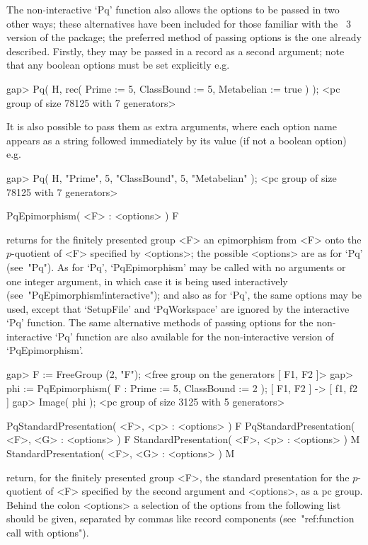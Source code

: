 The non-interactive `Pq' function also allows the options to be passed in
two other ways; these alternatives have been included for those  familiar
with the {\GAP}~3 version of the {\ANUPQ} package; the  preferred  method
of passing options is the one already described.  Firstly,  they  may  be
passed in a record as a second argument; note that  any  boolean  options
must be set explicitly e.g.

\beginexample
gap> Pq( H, rec( Prime := 5, ClassBound := 5, Metabelian := true ) );
<pc group of size 78125 with 7 generators>
\endexample

It is also possible to pass them as extra arguments, where each option
name appears as a string followed immediately by its value (if not a
boolean option) e.g.

\beginexample
gap> Pq( H, "Prime", 5, "ClassBound", 5, "Metabelian" );             
<pc group of size 78125 with 7 generators>
\endexample

\>PqEpimorphism( <F> : <options> ) F

returns for the finitely presented group <F> an epimorphism from <F> onto
the $p$-quotient of <F> specified by <options>;  the  possible  <options>
are as for `Pq' (see~"Pq"). As for `Pq', `PqEpimorphism'  may  be  called
with no arguments or one integer argument, in which case it is being used
interactively (see~"PqEpimorphism!interactive"); and also  as  for  `Pq',
the same options may be used, except that `SetupFile'  and  `PqWorkspace'
are ignored by  the  interactive  `Pq'  function.  The  same  alternative
methods of passing options for the non-interactive `Pq' function are also
available for the non-interactive version of `PqEpimorphism'.

\beginexample
gap> F := FreeGroup (2, "F");
<free group on the generators [ F1, F2 ]>
gap> phi := PqEpimorphism( F : Prime := 5, ClassBound := 2 );
[ F1, F2 ] -> [ f1, f2 ]
gap> Image( phi );
<pc group of size 3125 with 5 generators>
\endexample


\>PqStandardPresentation( <F>, <p> : <options> ) F
\>PqStandardPresentation( <F>, <G> : <options> ) F
\>StandardPresentation( <F>, <p> : <options> ) M
\>StandardPresentation( <F>, <G> : <options> ) M

return, for the finitely presented group <F>, the  standard  presentation
for the  $p$-quotient  of  <F>  specified  by  the  second  argument  and
<options>, as a pc group. Behind the colon <options> a selection  of  the
options from the following list should be given, separated by commas like
record components (see~"ref:function call with options").

